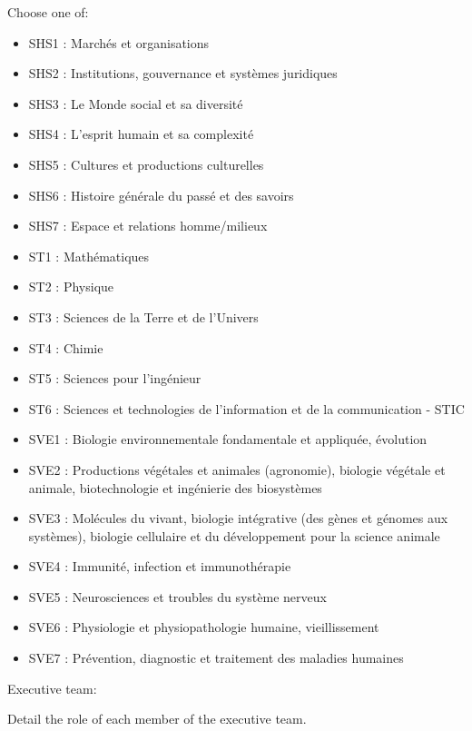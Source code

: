 \begin{hceresinstructions}
  Choose one of:
  \begin{itemize}
    \item SHS1 : Marchés et organisations
    \item SHS2 : Institutions, gouvernance et systèmes juridiques
    \item SHS3 : Le Monde social et sa diversité
    \item SHS4 : L'esprit humain et sa complexité
    \item SHS5 : Cultures et productions culturelles
    \item SHS6 : Histoire générale du passé et des savoirs
    \item SHS7 : Espace et relations homme/milieux
    \item ST1 : Mathématiques
    \item ST2 : Physique
    \item ST3 : Sciences de la Terre et de l'Univers
    \item ST4 : Chimie
    \item ST5 : Sciences pour l'ingénieur
    \item ST6 : Sciences et technologies de l'information et de la communication - STIC
    \item SVE1 : Biologie environnementale fondamentale et appliquée, évolution
    \item SVE2 : Productions végétales et animales (agronomie), biologie végétale et animale, biotechnologie et ingénierie des biosystèmes
    \item SVE3 : Molécules du vivant, biologie intégrative (des gènes et génomes aux systèmes), biologie cellulaire et du développement pour la science animale
    \item SVE4 : Immunité, infection et immunothérapie
    \item SVE5 : Neurosciences et troubles du système nerveux
    \item SVE6 : Physiologie et physiopathologie humaine, vieillissement
    \item SVE7 : Prévention, diagnostic et traitement des maladies humaines
  \end{itemize}
\end{hceresinstructions}

Executive team:

\begin{hceresinstructions}
  Detail the role of each member of the executive team.
\end{hceresinstructions}


